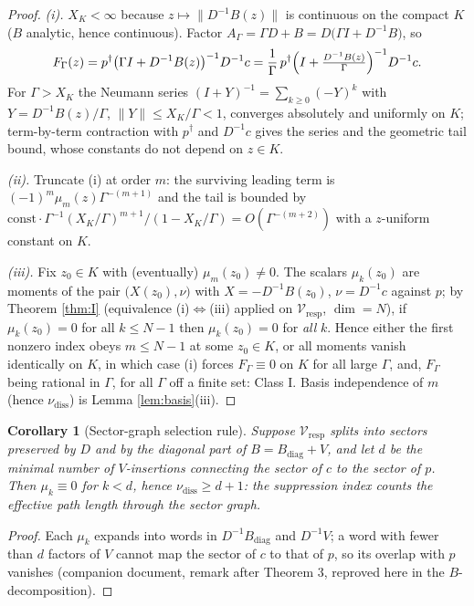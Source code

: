 \documentclass[11pt]{article}
\newtheorem{corollary}{Corollary}
\newcommand{\Vresp}{\mathcal V_{\mathrm{resp}}}
\newcommand{\nudiss}{\nu_{\mathrm{diss}}}
\begin{document}
\begin{proof}
\emph{(i).} $X_K<\infty$ because $z\mapsto\|D^{-1}B(z)\|$ is continuous on the
compact $K$ ($B$ analytic, hence continuous). Factor
$A_\Gamma=\Gamma D+B=D\bigl(\Gamma I+D^{-1}B\bigr)$, so
\[
F_\Gamma(z)=p^\dagger\bigl(\Gamma I+D^{-1}B(z)\bigr)^{-1}D^{-1}c
=\frac1\Gamma\,p^\dagger\Bigl(I+\tfrac{D^{-1}B(z)}{\Gamma}\Bigr)^{-1}D^{-1}c .
\]
For $\Gamma>X_K$ the Neumann series
$(I+Y)^{-1}=\sum_{k\ge0}(-Y)^k$ with $Y=D^{-1}B(z)/\Gamma$,
$\|Y\|\le X_K/\Gamma<1$, converges absolutely and uniformly on $K$;
term-by-term contraction with $p^\dagger$ and $D^{-1}c$ gives the series and
the geometric tail bound, whose constants do not depend on $z\in K$.

\emph{(ii).} Truncate (i) at order $m$: the surviving leading term is
$(-1)^m\mu_m(z)\Gamma^{-(m+1)}$ and the tail is bounded by
$\mathrm{const}\cdot\Gamma^{-1}(X_K/\Gamma)^{m+1}/(1-X_K/\Gamma)
=O(\Gamma^{-(m+2)})$ with a $z$-uniform constant on $K$.

\emph{(iii).} Fix $z_0\in K$ with (eventually) $\mu_m(z_0)\ne0$. The scalars
$\mu_k(z_0)$ are moments of the pair $\bigl(X(z_0),\nu\bigr)$ with
$X=-D^{-1}B(z_0)$, $\nu=D^{-1}c$ against $p$; by Theorem \ref{thm:I}
(equivalence (i)$\Leftrightarrow$(iii) applied on $\Vresp$, $\dim=N$), if
$\mu_k(z_0)=0$ for all $k\le N-1$ then $\mu_k(z_0)=0$ for \emph{all} $k$.
Hence either the first nonzero index obeys $m\le N-1$ at some $z_0\in K$, or
all moments vanish identically on $K$, in which case (i) forces
$F_\Gamma\equiv0$ on $K$ for all large $\Gamma$, and, $F_\Gamma$ being
rational in $\Gamma$, for all $\Gamma$ off a finite set: Class I. Basis
independence of $m$ (hence $\nudiss$) is Lemma \ref{lem:basis}(iii).
\end{proof}

\begin{corollary}[Sector-graph selection rule]
\label{cor:graph}
Suppose $\Vresp$ splits into sectors preserved by $D$ and by the diagonal part
of $B=B_{\mathrm{diag}}+V$, and let $d$ be the minimal number of
$V$-insertions connecting the sector of $c$ to the sector of $p$. Then
$\mu_k\equiv0$ for $k<d$, hence $\nudiss\ge d+1$: the suppression index counts
the effective path length through the sector graph.
\end{corollary}

\begin{proof}
Each $\mu_k$ expands into words in $D^{-1}B_{\mathrm{diag}}$ and $D^{-1}V$;
a word with fewer than $d$ factors of $V$ cannot map the sector of $c$ to that
of $p$, so its overlap with $p$ vanishes (companion document, remark after
Theorem 3, reproved here in the $B$-decomposition).
\end{proof}
\end{document}
